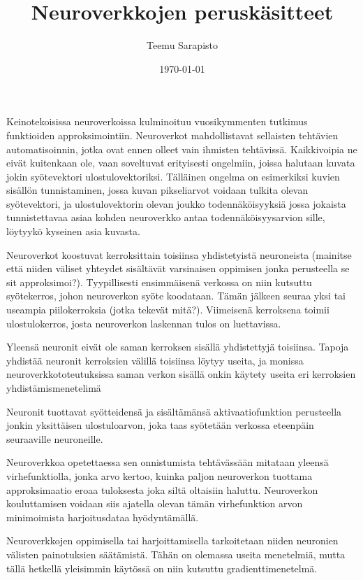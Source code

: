 \documentclass[finnish]{tktltiki2}
\title{Neuroverkkojen peruskäsitteet}
\author{Teemu Sarapisto}
\date{\today}
\begin{document}


  \maketitle



  \mainmatter       %

  Keinotekoisissa neuroverkoissa kulminoituu vuosikymmenten tutkimus funktioiden approksimointiin. Neuroverkot mahdollistavat sellaisten tehtävien automatisoinnin, jotka ovat ennen olleet vain ihmisten tehtävissä. Kaikkivoipia ne eivät kuitenkaan ole, vaan soveltuvat erityisesti ongelmiin, joissa halutaan kuvata jokin syötevektori ulostulovektoriksi. Tälläinen ongelma on esimerkiksi kuvien sisällön tunnistaminen, jossa kuvan pikseliarvot voidaan tulkita olevan syötevektori, ja ulostulovektorin olevan joukko todennäköisyyksiä jossa jokaista tunnistettavaa asiaa kohden neuroverkko antaa todennäköisyysarvion sille, löytyykö kyseinen asia kuvasta.

  Neuroverkot koostuvat kerroksittain toisiinsa yhdistetyistä neuroneista (mainitse että niiden väliset yhteydet sisältävät varsinaisen oppimisen jonka perusteella se sit approksimoi?). Tyypillisesti ensimmäisenä verkossa on niin kutsuttu syötekerros, johon neuroverkon syöte koodataan. Tämän jälkeen seuraa yksi tai useampia piilokerroksia (jotka tekevät mitä?). Viimeisenä kerroksena toimii ulostulokerros, josta neuroverkon laskennan tulos on luettavissa.

  Yleensä neuronit eivät ole saman kerroksen sisällä yhdistettyjä toisiinsa. Tapoja yhdistää neuronit kerroksien välillä toisiinsa löytyy useita, ja monissa neuroverkkototeutuksissa saman verkon sisällä onkin käytety useita eri kerroksien yhdistämismenetelimä
  
Neuronit tuottavat syötteidensä ja sisältämänsä aktivaatiofunktion perusteella jonkin yksittäisen ulostuloarvon, joka taas syötetään verkossa eteenpäin seuraaville neuroneille.
  

  Neuroverkkoa opetettaessa sen onnistumista tehtävässään mitataan yleensä virhefunktiolla, jonka arvo kertoo, kuinka paljon neuroverkon tuottama approksimaatio eroaa tuloksesta joka siltä oltaisiin haluttu. Neuroverkon kouluttamisen voidaan siis ajatella olevan tämän virhefunktion arvon minimoimista harjoitusdataa hyödyntämällä.

  Neuroverkkojen oppimisella tai harjoittamisella tarkoitetaan niiden neuronien välisten painotuksien säätämistä. Tähän on olemassa useita menetelmiä, mutta tällä hetkellä yleisimmin käytössä on niin kutsuttu gradienttimenetelmä.
\end{document}
